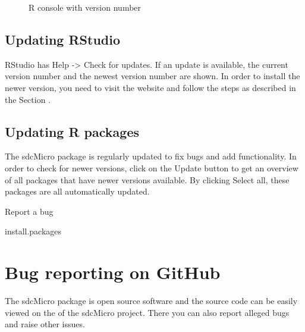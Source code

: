 \documentclass[letterpaper,10pt,english]{sphinxmanual}
\begin{document}
\begin{figure}[htbp]
\centering
\capstart

\noindent{}
\caption{R console with version number}\label{\detokenize{installation:fig27}}\label{\detokenize{installation:id13}}\end{figure}


\subsection{Updating RStudio}
\label{\detokenize{installation:updating-rstudio}}
RStudio has Help -\textgreater{} Check for updates. If an update is available, the current version number and the
newest version number are shown. In order to install the newer version, you need to visit the
 website and follow the steps
as described in the Section {\hyperref[\detokenize{installation:installing-r-and-rstudio}]{}}.


\subsection{Updating R packages}
\label{\detokenize{installation:updating-r-packages}}
The sdcMicro package is regularly updated to fix bugs and add functionality. In order to check
for newer versions, click on the Update button to get an overview of all packages that have
newer versions available. By clicking Select all, these packages are all automatically updated.

Report a bug

\def\sphinxLiteralBlockLabel{\label{\detokenize{installation:code03}}}
%
\begin{sphinxVerbatim}[commandchars=\\\{\},numbers=left,firstnumber=1,stepnumber=1]
install.packages
\end{sphinxVerbatim}


\section{Bug reporting on GitHub}
\label{\detokenize{installation:bug-reporting-on-github}}
The sdcMicro package is open source software and the source code can be easily viewed on
the  of the sdcMicro project. There you can
also report alleged bugs and raise other issues.
\end{document}
